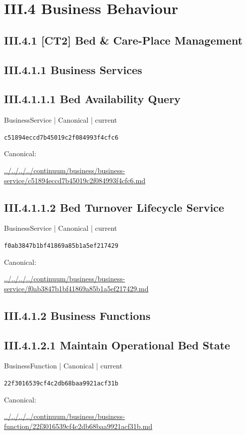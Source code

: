 \documentclass[10pt,a4paper]{article}
\begin{document}
\section*{III.4 Business Behaviour}
\subsection*{III.4.1 [CT2] Bed \& Care-Place Management}
\subsection*{III.4.1.1 Business Services}
\subsection*{III.4.1.1.1 Bed Availability Query}
{\small BusinessService | Canonical | current}\par
\texttt{c51894eccd7b45019c2f084993f4cfc6}\par
Canonical: \par
{\footnotesize\url{../../../../continuum/business/business-service/c51894eccd7b45019c2f084993f4cfc6.md}}\par
\subsection*{III.4.1.1.2 Bed Turnover Lifecycle Service}
{\small BusinessService | Canonical | current}\par
\texttt{f0ab3847b1bf41869a85b1a5ef217429}\par
Canonical: \par
{\footnotesize\url{../../../../continuum/business/business-service/f0ab3847b1bf41869a85b1a5ef217429.md}}\par
\subsection*{III.4.1.2 Business Functions}
\subsection*{III.4.1.2.1 Maintain Operational Bed State}
{\small BusinessFunction | Canonical | current}\par
\texttt{22f3016539cf4c2db68baa9921acf31b}\par
Canonical: \par
{\footnotesize\url{../../../../continuum/business/business-function/22f3016539cf4c2db68baa9921acf31b.md}}\par
\end{document}
